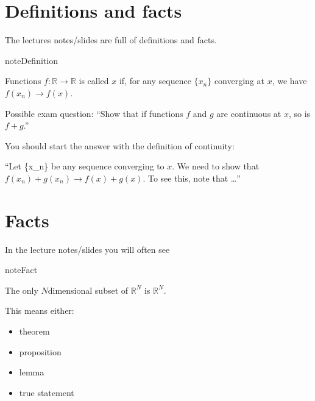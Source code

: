 \documentclass[letterpaper,10pt,english]{jupyterBook}
\begin{document}
\chapter{Definitions and facts}
\label{\detokenize{01.introduction:definitions-and-facts}}
\sphinxAtStartPar
The lectures notes/slides are full of definitions and facts.

\begin{sphinxadmonition}{note}{Definition}

\sphinxAtStartPar
Functions \(f: \mathbb{R} \rightarrow \mathbb{R}\) is called  \(x\) if, for any sequence \(\{x_n\}\) converging at \(x\), we have \(f(x_n) \rightarrow f(x)\).
\end{sphinxadmonition}

\sphinxAtStartPar
Possible exam question: “Show  that if functions \(f\) and \(g\) are continuous at \(x\), so is \(f+g\).”

\sphinxAtStartPar
You should start the answer with the definition of continuity:

\sphinxAtStartPar
“Let \{x\_n\} be any sequence converging to \(x\). We need to show that \(f(x_n) + g(x_n) \rightarrow f(x) + g(x)\). To see this, note that …”


\chapter{Facts}
\label{\detokenize{01.introduction:facts}}
\sphinxAtStartPar
In the lecture notes/slides you will often see

\begin{sphinxadmonition}{note}{Fact}

\sphinxAtStartPar
The only \(N\)\sphinxhyphen{}dimensional subset of \(\mathbb{R}^N\) is \(\mathbb{R}^N\).
\end{sphinxadmonition}

\sphinxAtStartPar
This means either:
\begin{itemize}
\item {} 
\sphinxAtStartPar
theorem

\item {} 
\sphinxAtStartPar
proposition

\item {} 
\sphinxAtStartPar
lemma

\item {} 
\sphinxAtStartPar
true statement

\end{itemize}
\end{document}
